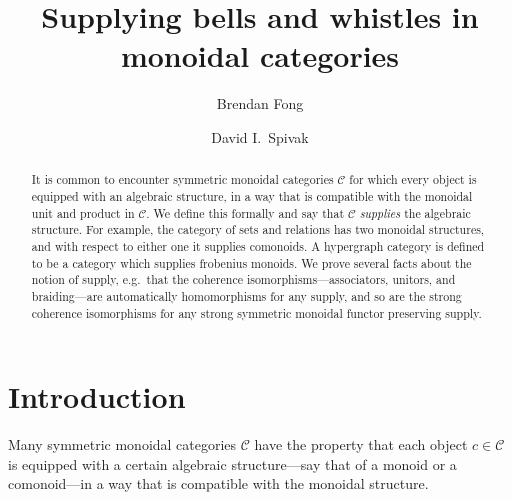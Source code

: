 \documentclass[11pt, oneside, article]{memoir}
\theoremstyle{plain}
\theoremstyle{definition}
\theoremstyle{remark}
\newcommand{\cat}[1]{\mathcal{#1}}%
\begin{document}
   

\title{Supplying bells and whistles in monoidal categories}
\author{Brendan Fong \and David I.\ Spivak}
\date{\vspace{-.3in}}
  
\maketitle

\begin{abstract}
It is common to encounter symmetric monoidal categories $\cat{C}$ for which every object is equipped with an algebraic structure, in a way that is compatible with the monoidal unit and product in $\cat{C}$. We define this formally and say that $\cat{C}$ \emph{supplies} the algebraic structure. For example, the category of sets and relations has two monoidal structures, and with respect to either one it supplies comonoids. A hypergraph category is defined to be a category which supplies frobenius monoids. We prove several facts about the notion of supply, e.g.\ that the coherence isomorphisms---associators, unitors, and braiding---are automatically homomorphisms for any supply, and so are the strong coherence isomorphisms for any strong symmetric monoidal functor preserving supply. 

\end{abstract}

\chapter{Introduction}

Many symmetric monoidal categories $\cat{C}$ have the property that each object $c\in\cat{C}$ is equipped with a certain algebraic structure---say that of a monoid or a comonoid---in a way that is compatible with the monoidal structure.
\end{document}
